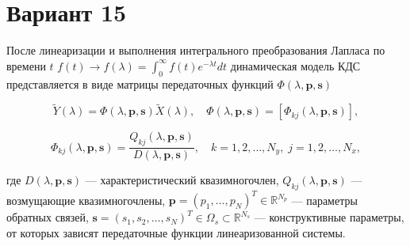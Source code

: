 \documentclass{article}
\begin{document}
\section*{Вариант 15}

После линеаризации и выполнения интегрального преобразования Лапласа по времени \( t \)  
\( f(t) \to f(\lambda) = \int_0^\infty f(t)e^{-\lambda t} dt \) динамическая модель КДС представляется в виде матрицы передаточных функций \( \Phi(\lambda, \mathbf{p}, \mathbf{s}) \)

\[
\tilde{Y}(\lambda) = \Phi(\lambda, \mathbf{p}, \mathbf{s})\tilde{X}(\lambda), \quad 
\Phi(\lambda, \mathbf{p}, \mathbf{s}) = [\Phi_{kj}(\lambda, \mathbf{p}, \mathbf{s})],
\]

\[
\Phi_{kj}(\lambda, \mathbf{p}, \mathbf{s}) = \frac{Q_{kj}(\lambda, \mathbf{p}, \mathbf{s})}{D(\lambda, \mathbf{p}, \mathbf{s})}, 
\quad k = 1, 2, \dots, N_y,\; j = 1, 2, \dots, N_x,
\]

где \( D(\lambda, \mathbf{p}, \mathbf{s}) \) — характеристический квазимногочлен, \( Q_{kj}(\lambda, \mathbf{p}, \mathbf{s}) \) — возмущающие квазимногочлены, 
\( \mathbf{p} = (p_1, \dots, p_N)^T \in \mathbb{R}^{N_p} \) — параметры обратных связей, 
\( \mathbf{s} = (s_1, s_2, \dots, s_N)^T \in \Omega_s \subset \mathbb{R}^{N_s} \) — конструктивные параметры, от которых зависят передаточные функции линеаризованной системы.
\end{document}
